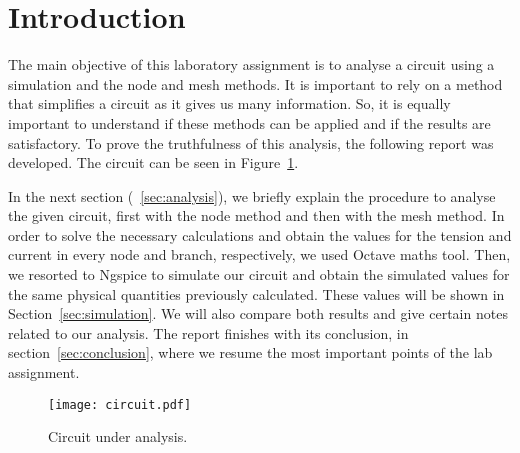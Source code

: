 \section{Introduction}
\label{sec:introduction}


The main objective of this laboratory assignment is to analyse a circuit using a simulation and the node and mesh methods. It is important to rely on a method that simplifies a circuit as it gives us many information. So, it is equally important to understand if these methods can be applied and if the results are satisfactory. To prove the truthfulness of this analysis, the following report was developed. The circuit can be seen in Figure~\ref{fig:circuit}.

In the next section (~\ref{sec:analysis}), we briefly explain the procedure to analyse the given circuit, first with the node method and then with the mesh method. In order to solve the necessary calculations and obtain the values for the tension and current in every node and branch, respectively, we used Octave maths tool.
Then, we resorted to Ngspice to simulate our circuit and obtain the simulated values for the same physical quantities previously calculated. These values will be shown in Section~\ref{sec:simulation}. We will also compare both results and give certain notes related to our analysis.
The report finishes with its conclusion, in section~\ref{sec:conclusion}, where we resume the most important points of the lab assignment.


\begin{figure}[h] \centering
\texttt{[image: circuit.pdf]}
\caption{Circuit under analysis.}
\label{fig:circuit}
\end{figure}




